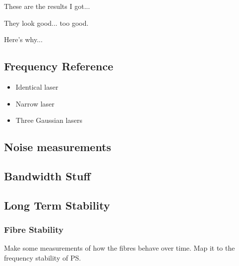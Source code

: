 These are the results I got...

They look good... too good.

Here's why...\cite{richter_linewidth_1986}

\subsection{Frequency Reference}
\begin{itemize}
\item Identical laser
\item Narrow laser
\item Three Gaussian lasers
\end{itemize}

\subsection{Noise measurements}

\subsection{Bandwidth Stuff}

\subsection{Long Term Stability}

\subsubsection{Fibre Stability}

Make some measurements of how the fibres behave over time. Map it to the frequency stability of PS.

